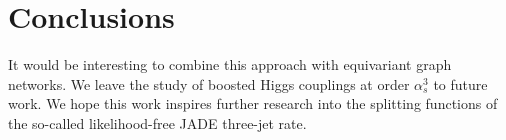 \section{Conclusions}\label{sec:conclusions}

It would be interesting to combine this approach with equivariant graph
networks. We leave the study of boosted Higgs couplings at order
$\alpha_s^3$ to future work. We hope this work inspires further research
into the splitting functions of the so-called likelihood-free JADE
three-jet rate.


